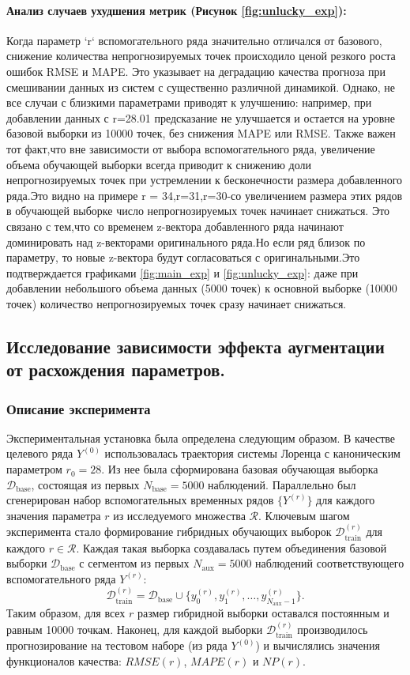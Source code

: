 \paragraph{Анализ случаев ухудшения метрик (Рисунок \ref{fig:unlucky_exp}):}
 Когда параметр `r` вспомогательного ряда значительно отличался от базового,
  снижение количества непрогнозируемых точек происходило ценой резкого роста
   ошибок RMSE и MAPE. Это указывает на деградацию качества прогноза при
   смешивании данных из систем с существенно различной динамикой. Однако,
    не все случаи с близкими параметрами приводят к улучшению:
    например, при добавлении данных с r=28.01 предсказание не улучшается
     и остается на уровне базовой выборки из 10000 точек, без снижения MAPE или RMSE.
Также важен тот факт,что вне зависимости от выбора вспомогательного ряда,
  увеличение объема обучающей выборки всегда приводит к снижению доли
   непрогнозируемых точек при устремлении к бесконечности размера добавленного ряда.Это видно на примере 
   r = 34,r=31,r=30-со увеличением размера этих рядов в обучающей выборке
    число непрогнозируемых точек начинает снижаться.
     Это связано с тем,что со временем z-вектора добавленного ряда начинают 
   доминировать над z-векторами оригинального ряда.Но если  ряд близок по параметру,
    то новые z-вектора будут согласоваться
    с оригинальными.Это подтверждается графиками \ref{fig:main_exp} и \ref{fig:unlucky_exp}: 
    даже при добавлении небольшого объема данных (5000 точек) к основной выборке (10000 точек) 
    количество непрогнозируемых точек сразу начинает снижаться.

\subsection{Исследование зависимости эффекта аугментации от расхождения параметров.}
\subsubsection{Описание эксперимента}
Экспериментальная установка была определена следующим образом. В
 качестве целевого ряда $Y^{(0)}$ использовалась траектория системы Лоренца с каноническим параметром 
 $r_0=28$. Из нее была сформирована базовая обучающая выборка $\mathcal{D}_{\text{base}}$, состоящая
  из первых $N_{\text{base}} = 5000$ наблюдений. Параллельно был сгенерирован набор вспомогательных временных
   рядов $\{Y^{(r)}\}$ для каждого значения параметра $r$ из исследуемого множества $\mathcal{R}$.
Ключевым шагом эксперимента стало формирование гибридных обучающих выборок $\mathcal{D}_{\text{train}}^{(r)}$ 
для каждого $r \in \mathcal{R}$. Каждая такая выборка создавалась путем объединения базовой выборки $\mathcal{D}_{\text{base}}$
 с сегментом из первых $N_{\text{aux}} = 5000$ наблюдений соответствующего вспомогательного ряда $Y^{(r)}$:
\[
\mathcal{D}_{\text{train}}^{(r)} = \mathcal{D}_{\text{base}} \cup \{y_0^{(r)}, y_1^{(r)}, \dots, y_{N_{\text{aux}}-1}^{(r)}\}.
\]
Таким образом, для всех $r$ размер гибридной выборки оставался постоянным и равным 10000 точкам.
 Наконец, для каждой выборки $\mathcal{D}_{\text{train}}^{(r)}$ производилось прогнозирование на
  тестовом наборе (из ряда $Y^{(0)}$) и вычислялись значения функционалов качества: $RMSE(r)$, $MAPE(r)$ и $NP(r)$.


